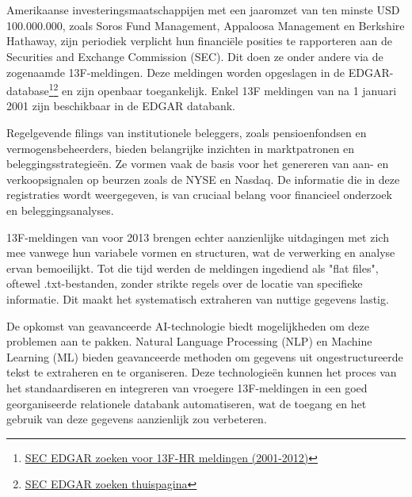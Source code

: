 
\chapter{}%
\label{ch:inleiding}
Amerikaanse investeringsmaatschappijen met een jaaromzet van ten minste USD 100.000.000, zoals Soros Fund Management, Appaloosa Management en Berkshire Hathaway, zijn periodiek verplicht hun financiële posities te rapporteren aan de Securities and Exchange Commission (SEC). Dit doen ze onder andere via de zogenaamde 13F-meldingen. Deze meldingen worden opgeslagen in de EDGAR-database\footnote{\href{https://www.sec.gov/edgar/search/\#/dateRange=custom\&category=custom\&startdt=2001-01-01\&enddt=2012-12-31\&forms=13F-HR}{SEC EDGAR zoeken voor 13F-HR meldingen (2001-2012)}}\footnote{\href{https://www.sec.gov/edgar/search/}{SEC EDGAR zoeken thuispagina}}
 en zijn openbaar toegankelijk. Enkel 13F meldingen van na 1 januari 2001 zijn beschikbaar in de EDGAR databank.


Regelgevende filings van institutionele beleggers, zoals pensioenfondsen en vermogensbeheerders, bieden belangrijke inzichten in marktpatronen en beleggingsstrategieën. Ze vormen vaak de basis voor het genereren van aan- en verkoopsignalen op beurzen zoals de NYSE en Nasdaq. De informatie die in deze registraties wordt weergegeven, is van cruciaal belang voor financieel onderzoek en beleggingsanalyses. 

13F-meldingen van voor 2013 brengen echter aanzienlijke uitdagingen met zich mee vanwege hun variabele vormen en structuren, wat de verwerking en analyse ervan bemoeilijkt. Tot die tijd werden de meldingen ingediend als "flat files", oftewel .txt-bestanden, zonder strikte regels over de locatie van specifieke informatie. Dit maakt het systematisch extraheren van nuttige gegevens lastig.

De opkomst van geavanceerde AI-technologie biedt mogelijkheden om deze problemen aan te pakken. Natural Language Processing (NLP) en Machine Learning (ML) bieden geavanceerde methoden om gegevens uit ongestructureerde tekst te extraheren en te organiseren. Deze technologieën kunnen het proces van het standaardiseren en integreren van vroegere 13F-meldingen in een goed georganiseerde relationele databank automatiseren, wat de toegang en het gebruik van deze gegevens aanzienlijk zou verbeteren.


